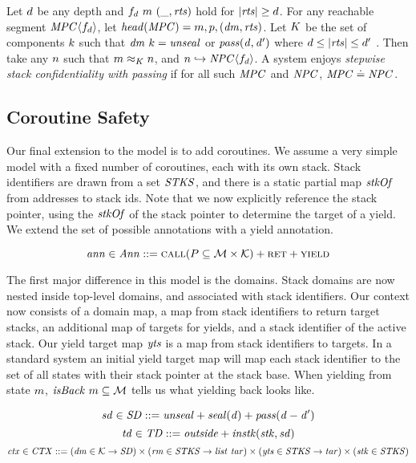 \documentclass[acmsmall,review,anonymous]{acmart}\settopmatter{printfolios=true,printccs=false,printacmref=false}
\begin{document}
 Let \(d\) be any depth and \(f_d ~ m ~ (\_, \mathit{rts})\) hold for
\(|\mathit{rts}| \geq d\). For any reachable segment \(\mathit{MPC} \langle f_d \rangle\),
let \(\mathit{head}(\mathit{MPC}) = m,p,(\mathit{dm},\mathit{rts})\). Let
\(K\) be the set of components \(k\) such that
\(\mathit{dm} ~ k = \mathit{unseal}\) or \(\mathit{pass(d,d')}\) where
\(d \leq |\mathit{rts}| \leq d'\) .
Then take any \(n\) such that \(m \approx_K n\), and
\(n \hookrightarrow \mathit{NPC}\langle f_d \rangle\). A system enjoys
{\em stepwise stack confidentiality with passing} if for all such \(\mathit{MPC}\) and \(\mathit{NPC}\),
\(\mathit{MPC} \doteq \mathit{NPC}\).

\subsection{Coroutine Safety}

Our final extension to the model is to add coroutines. We assume a very simple model with
a fixed number of coroutines, each with its own stack.
Stack identifiers are drawn from a set \(\mathit{STKS}\), and there is a static partial map
\(\mathit{stkOf}\) from addresses to stack ids. Note that we now explicitly reference the stack
pointer, using the \(\mathit{stkOf}\) of the stack pointer to determine the target of a yield.
We extend the set of possible annotations with a yield annotation.

\[\mathit{ann} \in \mathit{Ann} ::= \text{\sc call}(P \subseteq {\mathcal M} \times {\mathcal K}) + \text{\sc ret} + \text{\sc yield}\]

The first major difference in this model is the domains. Stack domains are now nested inside
top-level domains, and associated with stack identifiers.
Our context now consists of a domain map, a map from stack identifiers to return target stacks,
an additional map of targets for yields, and a stack identifier of the active stack.
Our yield target map \(\mathit{yts}\) is a map from stack identifiers to targets.
In a standard system an initial yield target map will map each stack identifier to the
set of all states with their stack pointer at the stack base. When yielding from state \(m\),
\(\mathit{isBack} ~ m \subseteq {\mathcal M}\) tells us what yielding back looks like.

\[\mathit{sd} \in \mathit{SD} ::= \mathit{unseal} + \mathit{seal(d)} + \mathit{pass(d-d')}\]
\[\mathit{td} \in \mathit{TD} ::= \mathit{outside} + \mathit{instk}(\mathit{stk},\mathit{sd})\]
\[\mathit{ctx} \in \mathit{CTX} ::= (\mathit{dm} \in {\mathcal K} \rightarrow \mathit{SD}) \times
(\mathit{rm} \in \mathit{STKS} \rightarrow \mathit{list} ~ \mathit{tar}) \times (\mathit{yts} \in \mathit{STKS} \rightarrow
\mathit{tar}) \times (\mathit{stk} \in \mathit{STKS})\]
\end{document}
